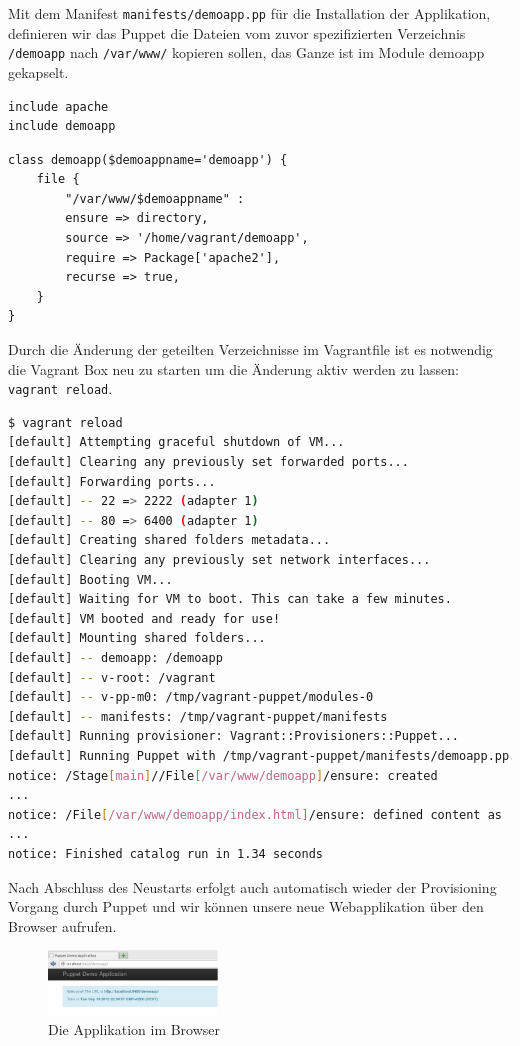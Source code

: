 \documentclass[12pt,a4paper,ngerman]{article}
\begin{document}
Mit dem Manifest \lstinline$manifests/demoapp.pp$ für die Installation der Applikation, definieren wir das Puppet die Dateien vom zuvor spezifizierten Verzeichnis \lstinline$/demoapp$ nach \lstinline$/var/www/$ kopieren sollen, das Ganze ist im Module demoapp gekapselt.
\begin{lstlisting}[language=puppet,caption=Puppet Manifest für die Applikation, label=puppetdemoapp]
include apache
include demoapp
\end{lstlisting}

\begin{lstlisting}[language=puppet,caption=Puppet Module demoapp,label=puppet-demo-module]
class demoapp($demoappname='demoapp') {
    file {
        "/var/www/$demoappname" :
        ensure => directory,
        source => '/home/vagrant/demoapp',
        require => Package['apache2'],
        recurse => true,
    }
}
\end{lstlisting}


Durch die Änderung der geteilten Verzeichnisse im Vagrantfile ist es notwendig die Vagrant Box neu zu starten um die Änderung aktiv werden zu lassen:  \lstinline$vagrant reload$.
\begin{lstlisting}[language=sh,caption=Puppet reload mit Provisioning der Applikation, label=reloaddemoapp]
$ vagrant reload
[default] Attempting graceful shutdown of VM...
[default] Clearing any previously set forwarded ports...
[default] Forwarding ports...
[default] -- 22 => 2222 (adapter 1)
[default] -- 80 => 6400 (adapter 1)
[default] Creating shared folders metadata...
[default] Clearing any previously set network interfaces...
[default] Booting VM...
[default] Waiting for VM to boot. This can take a few minutes.
[default] VM booted and ready for use!
[default] Mounting shared folders...
[default] -- demoapp: /demoapp
[default] -- v-root: /vagrant
[default] -- v-pp-m0: /tmp/vagrant-puppet/modules-0
[default] -- manifests: /tmp/vagrant-puppet/manifests
[default] Running provisioner: Vagrant::Provisioners::Puppet...
[default] Running Puppet with /tmp/vagrant-puppet/manifests/demoapp.pp...
notice: /Stage[main]//File[/var/www/demoapp]/ensure: created
...
notice: /File[/var/www/demoapp/index.html]/ensure: defined content as '{md5}90a8d419b9c7b43b09ba73abebaf8f4c'
...
notice: Finished catalog run in 1.34 seconds
\end{lstlisting}

Nach Abschluss des Neustarts erfolgt auch automatisch wieder der Provisioning Vorgang durch Puppet und wir können unsere neue Webapplikation über den Browser aufrufen.
\begin{figure}
  \begin{center}
    \includegraphics[width=0.4\textwidth]{images/demoapp.pdf}
  \end{center}
  \caption{Die Applikation im Browser}
  \label{demoapp}
\end{figure}
\end{document}
